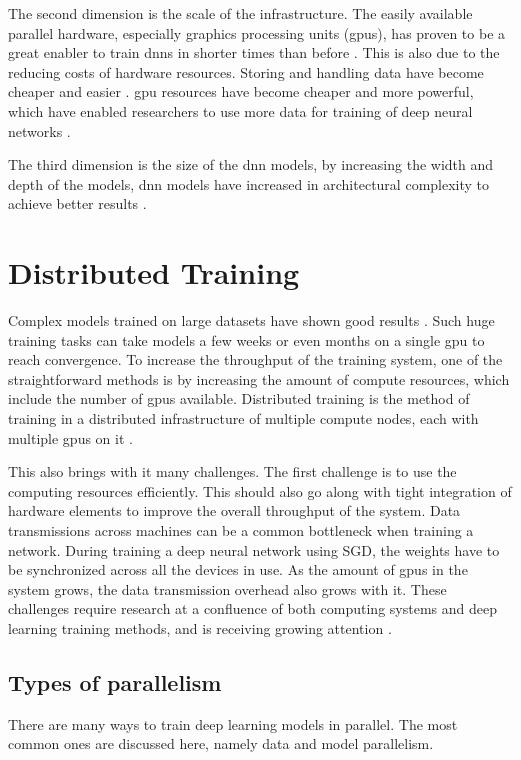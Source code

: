 The second dimension is the scale of the infrastructure. The easily available parallel hardware, especially graphics processing units (\acrshort{gpu}s), has proven to be a great enabler to train \acrshort{dnn}s in shorter times than before \cite{Zhang2017Poseidon:Clusters}. This is also due to the reducing costs of hardware resources. Storing and handling data have become cheaper and easier \cite{Sayed2014ASecurity}. \acrshort{gpu} resources have become cheaper and more powerful, which have enabled researchers to use more data for training of deep neural networks \cite{Sayed2014ASecurity}. 

The third dimension is the size of the \acrshort{dnn} models, by increasing the width and depth of the models, \acrshort{dnn} models have increased in architectural complexity to achieve better results \cite{Dean2012LargeNetworks}. 

\section{Distributed Training}
Complex models trained on large datasets have shown good results \cite{Dean2012LargeNetworks}. Such huge training tasks can take models a few weeks or even months on a single \acrshort{gpu} to reach convergence. To increase the throughput of the training system, one of the straightforward  methods is by increasing the amount of compute resources, which include the number of \acrshort{gpu}s available. Distributed training is the method of training in a distributed infrastructure of multiple compute nodes, each with multiple \acrshort{gpu}s on it \cite{Langer2020DistributedPerspective}. 

This also brings with it many challenges. The first challenge is to use the computing resources efficiently. This should also go along with tight integration of hardware elements to improve the overall throughput of the system. Data transmissions across machines can be a common bottleneck when training a network. During training a deep neural network using SGD, the weights have to be synchronized across all the devices in use. As the amount of \acrshort{gpu}s in the system grows, the data transmission overhead also grows with it. These challenges require research at a confluence of both computing systems and deep learning training methods, and is receiving growing attention \cite{Xiao2018Gandiva:Learning, Mai2020KungFu:Adaptive, Chilimbi2014ProjectSystem, Cui2016GeePS:Server, Peng2018Optimus:Clusters}.

\subsection{Types of parallelism}
There are many ways to train deep learning models in parallel. The most common ones are discussed here, namely data and model parallelism.

